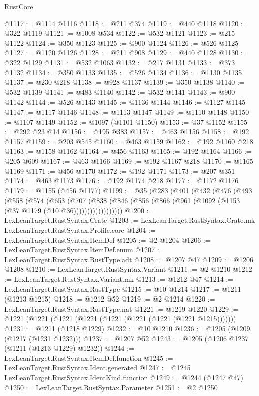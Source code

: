 \begin{lexlean}{RustCore}
\begin{coremodule}
@1117 := @1114 @1116
@1118 := @211 @374
@1119 := @440 @1118
@1120 := @322 @1119
@1121 := @1008 @534
@1122 := @532 @1121
@1123 := @215 @1122
@1124 := @350 @1123
@1125 := @900 @1124
@1126 := @526 @1125
@1127 := @1120 @1126
@1128 := @211 @908
@1129 := @440 @1128
@1130 := @322 @1129
@1131 := @532 @1063
@1132 := @217 @1131
@1133 := @373 @1132
@1134 := @350 @1133
@1135 := @526 @1134
@1136 := @1130 @1135
@1137 := @230 @218
@1138 := @928 @1137
@1139 := @350 @1138
@1140 := @532 @1139
@1141 := @483 @1140
@1142 := @532 @1141
@1143 := @900 @1142
@1144 := @526 @1143
@1145 := @1136 @1144
@1146 := @1127 @1145
@1147 := @1117 @1146
@1148 := @1113 @1147
@1149 := @1110 @1148
@1150 := @1107 @1149
@1152 := @1097 (@1101 @1150)
@1153 := @37 @1152
@1155 := @292 @23 @14
@1156 := @195 @383
@1157 := @463 @1156
@1158 := @192 @1157
@1159 := @203 @545
@1160 := @463 @1159
@1162 := @192 @1160 @218
@1163 := @1158 @1162
@1164 := @456 @1163
@1165 := @192 @1164
@1166 := @205 @609
@1167 := @463 @1166
@1169 := @192 @1167 @218
@1170 := @1165 @1169
@1171 := @456 @1170
@1172 := @192 @1171
@1173 := @207 @351
@1174 := @463 @1173
@1176 := @192 @1174 @218
@1177 := @1172 @1176
@1179 := @1155 (@456 @1177)
@1199 := @35
    (@283
      (@401
        (@432
          (@476
            (@493
              (@558
                (@574
                  (@653
                    (@707
                      (@838
                        (@846 (@856 (@866 (@961 (@1092 (@1153 (@37 @1179 (@10 @36))))))))))))))))))
@1200 := LexLeanTarget.RustSyntax.Crate
@1203 := LexLeanTarget.RustSyntax.Crate.mk LexLeanTarget.RustSyntax.Profile.core
@1204 := LexLeanTarget.RustSyntax.ItemDef
@1205 := @2 @1204
@1206 := LexLeanTarget.RustSyntax.ItemDef.enum
@1207 := LexLeanTarget.RustSyntax.RustType.adt
@1208 := @1207 @47
@1209 := @1206 @1208
@1210 := LexLeanTarget.RustSyntax.Variant
@1211 := @2 @1210
@1212 := LexLeanTarget.RustSyntax.Variant.mk
@1213 := @1212 @47
@1214 := LexLeanTarget.RustSyntax.RustType
@1215 := @10 @1214
@1217 := @1211 (@1213 @1215)
@1218 := @1212 @52
@1219 := @2 @1214
@1220 := LexLeanTarget.RustSyntax.RustType.nat
@1221 := @1219 @1220
@1229 := @1221 (@1221 (@1221 (@1221 (@1221 (@1221 (@1221 (@1221 @1215)))))))
@1231 := @1211 (@1218 @1229)
@1232 := @10 @1210
@1236 := @1205 (@1209 (@1217 (@1231 @1232)))
@1237 := @1207 @52
@1243 := @1205 (@1206 @1237 (@1211 (@1213 @1229) @1232))
@1244 := LexLeanTarget.RustSyntax.ItemDef.function
@1245 := LexLeanTarget.RustSyntax.Ident.generated
@1247 := @1245 LexLeanTarget.RustSyntax.IdentKind.function
@1249 := @1244 (@1247 @47)
@1250 := LexLeanTarget.RustSyntax.Parameter
@1251 := @2 @1250

\end{coremodule}
\end{lexlean}
